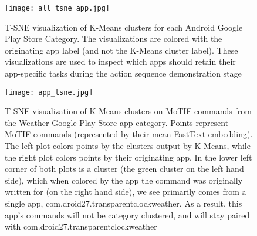 \begin{figure}
    \centering
    \texttt{[image: all\_tsne\_app.jpg]}
    \caption{T-SNE visualization of K-Means clusters for each Android Google Play Store Category. The visualizations are colored with the originating app label (and not the K-Means cluster label). These visualizations are used to inspect which apps should retain
    their app-specific tasks during the action sequence demonstration stage}
    \label{fig:all_app_tsne}
\end{figure}

\begin{figure}
    \centering
    \texttt{[image: app\_tsne.jpg]}
    \caption{T-SNE visualization of K-Means clusters on MoTIF commands from the Weather Google Play Store app category. Points represent MoTIF commands (represented by their mean FastText embedding). The left plot colors points by the clusters output by K-Means, while the right plot colors points by their originating app. In the lower left corner of both plots is a cluster (the green cluster on the left hand side), which when colored by the app the command was originally written for (on the right hand side), we see primarily comes from a single app, com.droid27.transparentclockweather. As a result, this app's commands will not be category clustered, and will stay paired with com.droid27.transparentclockweather}
    \label{fig:tsne1}
\end{figure}

